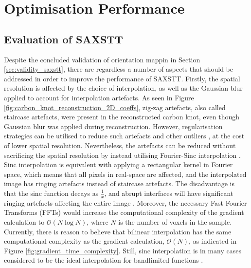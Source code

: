 \chapter{Optimisation Performance}\label{ch:optimisation_performance}

\section{Evaluation of SAXSTT}

Despite the concluded validation of orientation mappin in Section \ref{sec:validity_saxstt},
there are regardless a number of aspects that should be addressed in order to improve the performance of SAXSTT.
Firstly, the spatial resolution is affected by the choice of interpolation, as well as the Gaussian blur applied to account for interpolation artefacts.
As seen in Figure \ref{fig:carbon_knot_reconstruction_2D_coeffs}, zig-zag artefacts, also called staircase artefacts, were present in the reconstructed carbon knot, even though Gaussian blur was applied during reconstruction.
However, regularisation strategies can be utilised to reduce such artefacts and other outliers \cite{liebi2018small}, at the cost of lower spatial resolution.
Nevertheless, the artefacts can be reduced without sacrificing the spatial resolution by instead utilising Fourier-Sinc interpolation \cite{Sinc_interpolation_2016}.
Sinc interpolation is equivalent with applying a rectangular kernel in Fourier space, which means that all pixels in real-space are affected, and the interpolated image has ringing artefacts instead of staircase artefacts. %
The disadvantage is that the sinc function decays as $\frac{1}{x}$, and abrupt interfaces will have significant ringing artefacts affecting the entire image \cite{ipol.2011.g_lmii}. %
Moreover, the necessary Fast Fourier Transforms (FFTs) would increase the computational complexity of the gradient calculation to $\mathcal{O}(N\log{N})$,
where $N$ is the number of voxels in the sample. %
Currently, there is reason to believe that bilinear interpolation has the same computational complexity as the gradient calculation, $\mathcal{O}(N)$, as indicated in Figure \ref{fig:gradient_time_complexity}.
Still, sinc interpolation is in many cases considered to be the ideal interpolation for bandlimited functions \cite{ipol.2011.g_lmii}. %

